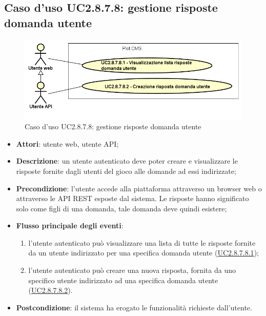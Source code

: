 \subsection{Caso d'uso UC2.8.7.8: gestione risposte domanda utente}

        \begin{figure}[H]
            \centering
            \includegraphics[scale=0.45, width=\textwidth]{immagini/usecase/UC2-8-7-8.png}
            \caption{Caso d'uso UC2.8.7.8: gestione risposte domanda utente}\label{fig:UC2.8.7.8} 
        \end{figure}
\begin{itemize}
\item \textbf{Attori}: utente web, utente API;
\item \textbf{Descrizione}: un utente autenticato deve poter creare e visualizzare le risposte fornite dagli utenti del gioco alle domande ad essi indirizzate; 
      \item \textbf{Precondizione}: l'utente accede alla piattaforma attraverso un browser web o attraverso le API REST esposte dal sistema. Le risposte hanno significato solo come figli di una domanda, tale domanda deve quindi esistere;

        \item \textbf{Flusso principale degli eventi}:
          \begin{enumerate}
          \item l'utente autenticato può visualizzare una lista di tutte le risposte fornite da un utente indirizzato per una specifica domanda utente (\hyperlink{UC2.8.7.8.1}{UC2.8.7.8.1});
          \item l'utente autenticato può creare una nuova risposta, fornita da uno specifico utente indirizzato ad una specifica domanda utente (\hyperlink{UC2.8.7.8.2}{UC2.8.7.8.2}).

      \end{enumerate}
    \item \textbf{Postcondizione}: il sistema ha erogato le funzionalità richieste dall'utente.
  \end{itemize}
\hypertarget{UC2.8.7.8.1}{}
